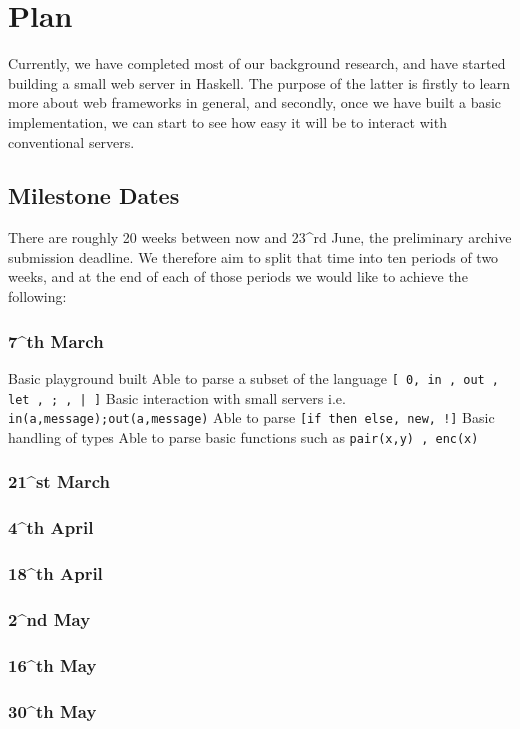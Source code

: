 \section{Plan}

Currently, we have completed most of our background research, and have started building a small web server in Haskell. The purpose of the latter is firstly to learn more about web frameworks in general, and secondly, once we have built a basic implementation, we can start to see how easy it will be to interact with conventional servers.

\subsection{Milestone Dates}

There are roughly 20 weeks between now and 23^{rd} June, the preliminary archive submission deadline. We therefore aim to split that time into ten periods of two weeks, and at the end of each of those periods we would like to achieve the following:
\subsubsection{7^{th} March} 
Basic playground built    
Able to parse a subset of the language \verb![ 0, in , out , let , ; , | ]! 
Basic interaction with small servers i.e. \verb!in(a,message);out(a,message)!   
Able to parse \verb?[if then else, new, !]?    
Basic handling of types  
Able to parse basic functions such as \verb!pair(x,y) , enc(x)!  

\subsubsection{21^{st} March}
\subsubsection{4^{th} April}  
\subsubsection{18^{th} April}
\subsubsection{2^{nd} May}    
\subsubsection{16^{th} May}   
\subsubsection{30^{th} May}     
